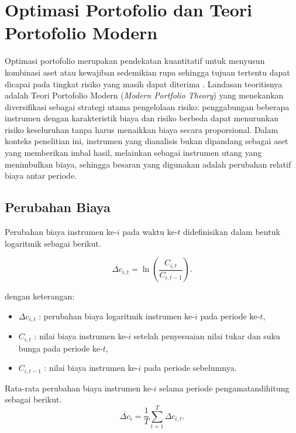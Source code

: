 
\section{Optimasi Portofolio dan Teori Portofolio Modern} \label{sec:optimasi-portofolio}

Optimasi portofolio merupakan pendekatan kuantitatif untuk menyusun kombinasi aset atau kewajiban sedemikian rupa sehingga tujuan tertentu dapat dicapai pada tingkat risiko yang masih dapat diterima . Landasan teoritisnya adalah Teori Portofolio Modern (\textit{Modern Portfolio Theory}) yang menekankan diversifikasi sebagai strategi utama pengelolaan risiko: penggabungan beberapa instrumen dengan karakteristik biaya dan risiko berbeda dapat menurunkan risiko keseluruhan tanpa harus menaikkan biaya secara proporsional. Dalam konteks penelitian ini, instrumen yang dianalisis bukan dipandang sebagai aset yang memberikan imbal hasil, melainkan sebagai instrumen utang yang menimbulkan biaya, sehingga besaran yang digunakan adalah perubahan relatif biaya antar periode.


    \subsection{Perubahan Biaya}\label{sub:perubahan-biaya}
    Perubahan biaya instrumen ke-$i$ pada waktu ke-$t$ didefinisikan dalam bentuk logaritmik sebagai berikut.

    \begin{equation}
        \label{eq:perubahan-cost}
        \Delta c_{i,t} = \ln\!\left(\frac{C_{i,t}}{C_{i,t-1}}\right).
    \end{equation}

    dengan keterangan:
    \begin{itemize}
        \item $\Delta c_{i,t}$ : perubahan biaya logaritmik instrumen ke-$i$ pada periode ke-$t$,
        \item $C_{i,t}$ : nilai biaya instrumen ke-$i$ setelah penyesuaian nilai tukar dan suku bunga pada periode ke-$t$,
        \item $C_{i,t-1}$ : nilai biaya instrumen ke-$i$ pada periode sebelumnya.
    \end{itemize}

    Rata-rata perubahan biaya instrumen ke-$i$ selama periode pengamatandihitung sebagai berikut.
    \begin{equation}
        \label{eq:rata-cost}
        \overline{\Delta c}_i = \frac{1}{T}\sum_{t=1}^{T} \Delta c_{i,t}.
    \end{equation}

